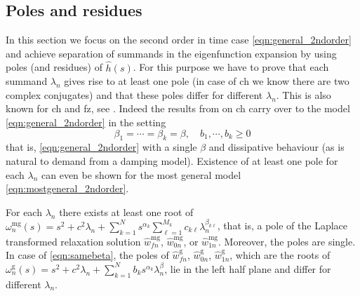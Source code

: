 \subsection{Poles and residues}\label{sec:poles}
In this section we focus on the second order in time case
\eqref{eqn:general_2ndorder} and achieve separation of summands in the
eigenfunction expansion by using poles (and residues) of $\hat{h}(s)$.
For this purpose we have to prove that each summand $\lambda_n$ gives rise to at
least one pole (in case of {\sc ch} we know there are two complex conjugates) and
that these poles differ for different $\lambda_n$.
This is also known for {\sc ch} and {\sc fz}, see 
\cite[Section 4]{KaltenbacherRundell:2021b}.
Indeed the results from 
\cite[Lemma 4.1, Remark 4.1]{KaltenbacherRundell:2021b}
on {\sc ch} carry over to the model \eqref{eqn:general_2ndorder} in the setting
\begin{equation}\label{eqn:samebeta}
\beta_1=\cdots=\beta_k=\beta, \quad b_1,\cdots,b_k\geq0 
\end{equation}
that is, \eqref{eqn:general_2ndorder} with a single $\beta$ and dissipative behaviour (as is natural to demand from a damping model). 
Existence of at least one pole for each $\lambda_n$ can even be shown for the most
general model \eqref{eqn:mostgeneral_2ndorder}. 
\begin{lemma}\label{lem:what}
For each $\lambda_n$ there exists at least one root of 
$\omega^{\text{mg}}_n(s)=s^2+c^2\lambda_n+\sum_{k=1}^N s^{\alpha_k}\sum_{\ell=1}^{M_k} c_{k\ell}\lambda_n^{\beta_{k\ell}}$, that is, a pole of the Laplace transformed relaxation solution $\hat{w}^{\text{mg}}_{fn}$, $\hat{w}^{\text{mg}}_{0n}$, or $\hat{w}^{\text{mg}}_{1n}$.
Moreover, the poles are single.
\\
In case of \eqref{eqn:samebeta}, the poles of $\hat{w}^{\text{g}}_{fn}$, $\hat{w}^{\text{g}}_{0n}$, $\hat{w}^{\text{g}}_{1n}$, which are the roots of $\omega^{\text{g}}_n(s)=s^2+c^2\lambda_n+\sum_{k=1}^N b_k s^{\alpha_k} \lambda_n^\beta$, lie in the left half plane and differ for different $\lambda_n$.  
\end{lemma}
